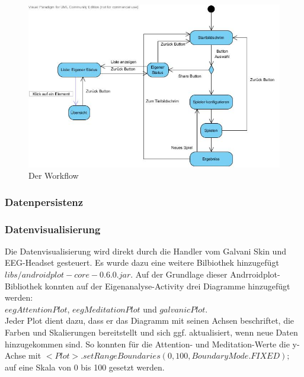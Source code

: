 	\begin{figure}[hbtp]
	\centering
	\includegraphics[scale=0.5]{img/Workflow.jpg}
	\caption{Der Workflow}
	\label{fig:Workflow}
	\end{figure}
	
	
	\subsubsection{Datenpersistenz}
	
	
	\subsubsection{Datenvisualisierung}\label{datenvisualisierung}

Die Datenvisualisierung wird direkt durch die Handler vom Galvani Skin und EEG-Headset gesteuert. 
Es wurde dazu eine weitere Bilbiothek hinzugefügt\\ $libs/androidplot-core-0.6.0.jar$. 
Auf der Grundlage dieser Andrroidplot-Bibliothek konnten auf der Eigenanalyse-Activity drei Diagramme hinzugefügt werden: \\$eegAttentionPlot$, $eegMeditationPlot$ und $galvanicPlot$.\\
Jeder Plot dient dazu, dass er das Diagramm mit seinen Achsen beschriftet, die Farben und Skalierungen bereitstellt und sich ggf. aktualisiert, wenn neue Daten hinzugekommen sind.
So konnten für die Attention- und Meditation-Werte die y-Achse mit $<Plot>.setRangeBoundaries(0, 100, BoundaryMode.FIXED);$ auf eine Skala von 0 bis 100 gesetzt werden.

